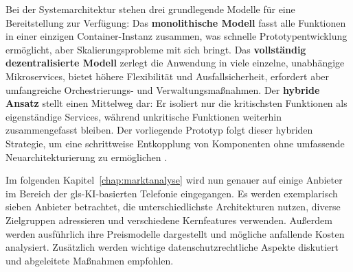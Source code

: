 Bei der Systemarchitektur stehen drei grundlegende Modelle für eine Bereitstellung zur Verfügung: Das \textbf{monolithische Modell} fasst alle Funktionen in einer einzigen Container-Instanz zusammen, was schnelle Prototypentwicklung ermöglicht, aber Skalierungsprobleme mit sich bringt. Das \textbf{vollständig dezentralisierte Modell} zerlegt die Anwendung in viele einzelne, unabhängige Mikroservices, bietet höhere Flexibilität und Ausfallsicherheit, erfordert aber umfangreiche Orchestrierungs- und Verwaltungsma\ss nahmen. Der \textbf{hybride Ansatz} stellt einen Mittelweg dar: Er isoliert nur die kritischsten Funktionen als eigenständige Services, während unkritische Funktionen weiterhin zusammengefasst bleiben. Der vorliegende Prototyp folgt dieser hybriden Strategie, um eine schrittweise Entkopplung von Komponenten ohne umfassende Neuarchitekturierung zu ermöglichen \parencite{Antonova2025}.

Im folgenden Kapitel~\ref{chap:marktanalyse} wird nun genauer auf einige Anbieter im Bereich der \gls{gls-KI}-basierten Telefonie eingegangen. Es werden exemplarisch sieben Anbieter betrachtet, die unterschiedlichste Architekturen nutzen, diverse Zielgruppen adressieren und verschiedene Kernfeatures verwenden. Au\ss erdem werden ausführlich ihre Preismodelle dargestellt und mögliche anfallende Kosten analysiert. Zusätzlich werden wichtige datenschutzrechtliche Aspekte diskutiert und abgeleitete Ma\ss nahmen empfohlen.
